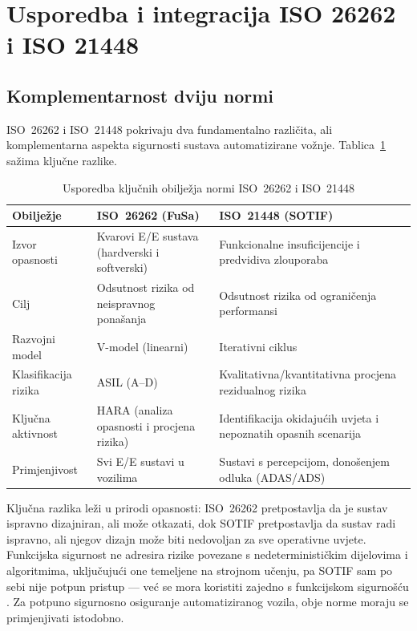 \section{Usporedba i integracija ISO 26262 i ISO 21448}
\label{sec:usporedba}

\subsection{Komplementarnost dviju normi}

ISO~26262 i ISO~21448 pokrivaju dva fundamentalno različita, ali komplementarna aspekta sigurnosti sustava automatizirane vožnje. Tablica~\ref{tab:usporedba} sažima ključne razlike.

\begin{table}[H]
\centering
\caption{Usporedba ključnih obilježja normi ISO~26262 i ISO~21448}
\label{tab:usporedba}
\begin{tabularx}{\textwidth}{l X X}
\toprule
\textbf{Obilježje} & \textbf{ISO~26262 (FuSa)} & \textbf{ISO~21448 (SOTIF)} \\
\midrule
Izvor opasnosti & Kvarovi E/E sustava (hardverski i softverski) & Funkcionalne insuficijencije i predvidiva zlouporaba \\
\addlinespace
Cilj & Odsutnost rizika od neispravnog ponašanja & Odsutnost rizika od ograničenja performansi \\
\addlinespace
Razvojni model & V-model (linearni) & Iterativni ciklus \\
\addlinespace
Klasifikacija rizika & ASIL (A--D) & Kvalitativna/kvantitativna procjena rezidualnog rizika \\
\addlinespace
Ključna aktivnost & HARA (analiza opasnosti i procjena rizika) & Identifikacija okidajućih uvjeta i nepoznatih opasnih scenarija \\
\addlinespace
Primjenjivost & Svi E/E sustavi u vozilima & Sustavi s percepcijom, donošenjem odluka (ADAS/ADS) \\
\bottomrule
\end{tabularx}
\end{table}

Ključna razlika leži u prirodi opasnosti: ISO~26262 pretpostavlja da je sustav ispravno dizajniran, ali može otkazati, dok SOTIF pretpostavlja da sustav radi ispravno, ali njegov dizajn može biti nedovoljan za sve operativne uvjete. Funkcijska sigurnost ne adresira rizike povezane s nedeterminističkim dijelovima i algoritmima, uključujući one temeljene na strojnom učenju, pa SOTIF sam po sebi nije potpun pristup — već se mora koristiti zajedno s funkcijskom sigurnošću \cite{patel2025sotifslr}. Za potpuno sigurnosno osiguranje automatiziranog vozila, obje norme moraju se primjenjivati istodobno.

